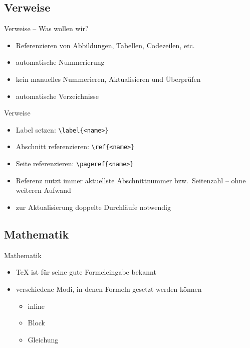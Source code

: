 \documentclass[presentation,aspectratio=169]{beamer}
\begin{document}
\subsection{Verweise}

\begin{frame}{Verweise -- Was wollen wir?}
  \begin{itemize}
    \item Referenzieren von Abbildungen, Tabellen, Codezeilen, etc.
    \item automatische Nummerierung
    \item kein manuelles Nummerieren, Aktualisieren und Überprüfen
    \item automatische Verzeichnisse
  \end{itemize}
\end{frame}

\begin{frame}[fragile]{Verweise}
  \begin{itemize}
    \item Label setzen: \verb|\label{<name>}|
    \item Abschnitt referenzieren: \verb|\ref{<name>}|
    \item Seite referenzieren: \verb|\pageref{<name>}|
    \item Referenz nutzt immer aktuellste Abschnittnummer bzw.~Seitenzahl -- ohne weiteren Aufwand
    \item zur Aktualisierung doppelte Durchläufe notwendig
  \end{itemize}
\end{frame}

\subsection{Mathematik}

\begin{frame}{Mathematik}
  \begin{itemize}
    \item \TeX{} ist für seine gute Formeleingabe bekannt
    \item verschiedene Modi, in denen Formeln gesetzt werden können
      \begin{itemize}
        \item inline
        \item Block
        \item Gleichung
      \end{itemize}
  \end{itemize}
\end{frame}
\end{document}
